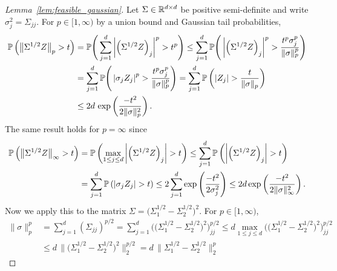 \begin{proof}[Lemma~\ref{lem:feasible_gaussian}]

  Let $\Sigma \in \R^{d \times d}$ be positive semi-definite
  and write $\sigma^2_j = \Sigma_{j j} $.
  For $p \in [1, \infty)$ by a union bound and
  Gaussian tail probabilities,
  \begin{align*}
    \P\left(\big\| \Sigma^{1/2} Z \big\|_p > t \right)
    &=
    \P\Bigg(
      \sum_{j=1}^d
      \left|
      \left(
        \Sigma^{1/2} Z
      \right)_j
      \right|^p
    > t^p \Bigg)
    \leq
    \sum_{j=1}^d
    \P\Bigg(
      \left|
      \left(
        \Sigma^{1/2} Z
      \right)_j
      \right|^p
      > \frac{t^p \sigma_j^p}{\|\sigma\|_p^p}
    \Bigg) \\
    &=
    \sum_{j=1}^d
    \P\Bigg(
      \left|
      \sigma_j Z_j
      \right|^p
      > \frac{t^p \sigma_j^p}{\|\sigma\|_p^p}
    \Bigg)
    =
    \sum_{j=1}^d
    \P\left(
      \left| Z_j \right|
      > \frac{t}{\|\sigma\|_p}
    \right) \\
    &\leq
    2 d \,
    \exp\left( \frac{-t^2}{2 \|\sigma\|_p^2} \right).
  \end{align*}
  The same result holds for $p = \infty$ since
  \begin{align*}
    \P\left(\big\| \Sigma^{1/2} Z \big\|_\infty > t \right)
    &=
    \P\left(
      \max_{1 \leq j \leq d}
      \left|
      \left(
        \Sigma^{1/2} Z
      \right)_j
      \right|
    > t \right)
    \leq
    \sum_{j=1}^d
    \P\left(
      \left|
      \left(
        \Sigma^{1/2} Z
      \right)_j
      \right|
      > t
    \right) \\
    &=
    \sum_{j=1}^d
    \P\left(
      \left|
      \sigma_j Z_j
      \right|
      > t
    \right)
    \leq
    2 \sum_{j=1}^d
    \exp\left( \frac{-t^2}{2 \sigma_j^2} \right)
    \leq
    2 d
    \exp\left( \frac{-t^2}{2 \|\sigma\|_\infty^2} \right).
  \end{align*}
  Now we apply this to the matrix
  $\Sigma = \big(\Sigma_1^{1/2} - \Sigma_2^{1/2}\big)^2$.
  For $p \in [1, \infty)$,
  \begin{align*}
    \|\sigma\|_p^p
    &=
    \sum_{j=1}^d (\Sigma_{j j})^{p/2}
    =
    \sum_{j=1}^d
    \Big(\big(\Sigma_1^{1/2} - \Sigma_2^{1/2}\big)^2\Big)_{j j}^{p/2}
    \leq
    d \max_{1 \leq j \leq d}
    \Big(\big(\Sigma_1^{1/2} - \Sigma_2^{1/2}\big)^2\Big)_{j j}^{p/2} \\
    &\leq
    d \, \Big\|\big(\Sigma_1^{1/2} - \Sigma_2^{1/2}\big)^2\Big\|_2^{p/2}
    =
    d \, \big\|\Sigma_1^{1/2} - \Sigma_2^{1/2}\big\|_2^p

\end{align*}
\end{proof}
